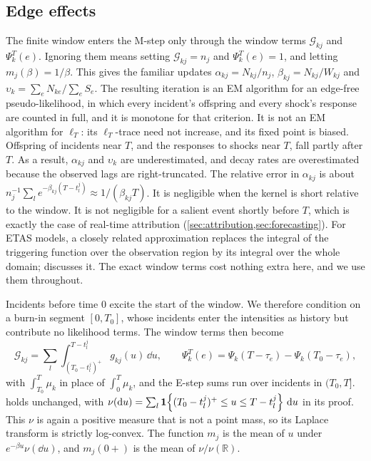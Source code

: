 \subsection{Edge effects}\label{app:est-edge}

\begin{remark}\label{rem:est-edge}
The finite window enters the M-step only through the window terms $\mathcal G_{kj}$ and
$\Psi^T_k(e)$. Ignoring them means setting $\mathcal G_{kj}=n_j$ and $\Psi^T_k(e)=1$, and
letting $m_j(\beta)=1/\beta$. This gives the familiar updates $\alpha_{kj}=N_{kj}/n_j$,
$\beta_{kj}=N_{kj}/W_{kj}$ and $\upsilon_k=\sum_eN_{ke}/\sum_eS_e$. The resulting iteration is
an EM algorithm for an edge-free pseudo-likelihood, in which every incident's offspring and
every shock's response are counted in full, and it is monotone for that criterion. It is
not an EM algorithm for $\ell_T$: its $\ell_T$-trace need not increase, and its fixed point
is biased. Offspring of incidents near $T$, and the responses to shocks near $T$, fall
partly after $T$. As a result, $\alpha_{kj}$ and $\upsilon_k$ are underestimated, and decay
rates are overestimated because the observed lags are right-truncated. The relative error
in $\alpha_{kj}$ is about $n_j^{-1}\sum_le^{-\beta_{kj}(T-t^j_l)}\approx1/(\beta_{kj}T)$. It
is negligible when the kernel is short relative to the window. It is not negligible for a
salient event shortly before $T$, which is exactly the case of real-time attribution
(\cref{sec:attribution,sec:forecasting}). For ETAS models, a closely related approximation
replaces the integral of the triggering function over the observation region by its
integral over the whole domain; \citet{schoenberg2013} discusses it. The exact window terms
cost nothing extra here, and we use them throughout.

Incidents before time $0$ excite the start of the window. We therefore condition on a
burn-in segment $[0,T_0]$, whose incidents enter the intensities as history but contribute
no likelihood terms. The window terms then become
\[
  \mathcal G_{kj}=\sum_{l}\int_{(T_0-t^j_l)^+}^{T-t^j_l}g_{kj}(u)\,\dd u,\qquad
  \Psi^T_k(e)=\Psi_k(T-\tau_e)-\Psi_k(T_0-\tau_e),
\]
with $\int_{T_0}^T\mu_k$ in place of $\int_0^T\mu_k$, and the E-step sums run over
incidents in $(T_0,T]$.  holds unchanged, with
$\nu(\mathrm{d} u)=\sum_l\mathbf{1}\!\left\{(T_0-t^j_l)^+\le u\le T-t^j_l\right\}\,\mathrm{d} u$ in its proof. This $\nu$ is
again a positive measure that is not a point mass, so its Laplace transform is strictly
log-convex. The function $m_j$ is the mean of $u$ under $e^{-\beta u}\nu(\dd u)$, and
$m_j(0+)$ is the mean of $\nu/\nu(\mathbb R)$.
\end{remark}

